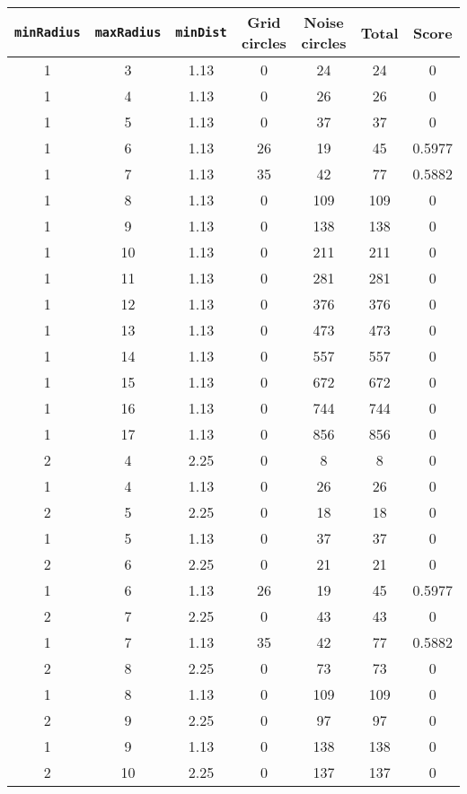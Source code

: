 \documentclass[letterpaper, 12pt]{article}
\begin{document}
\begin{longtable}{|c|c|c|c|c|c|c|}
\hline
\textbf{\texttt{minRadius}} & \textbf{\texttt{maxRadius}} & \textbf{\texttt{minDist}} & \textbf{Grid circles} & \textbf{Noise circles} & \textbf{Total} & \textbf{Score} \\
\hline
1 & 3 & 1.13 & 0 & 24 & 24 & 0 \\
\hline
1 & 4 & 1.13 & 0 & 26 & 26 & 0 \\
\hline
1 & 5 & 1.13 & 0 & 37 & 37 & 0 \\
\hline
1 & 6 & 1.13 & 26 & 19 & 45 & 0.5977 \\
\hline
1 & 7 & 1.13 & 35 & 42 & 77 & 0.5882 \\
\hline
1 & 8 & 1.13 & 0 & 109 & 109 & 0 \\
\hline
1 & 9 & 1.13 & 0 & 138 & 138 & 0 \\
\hline
1 & 10 & 1.13 & 0 & 211 & 211 & 0 \\
\hline
1 & 11 & 1.13 & 0 & 281 & 281 & 0 \\
\hline
1 & 12 & 1.13 & 0 & 376 & 376 & 0 \\
\hline
1 & 13 & 1.13 & 0 & 473 & 473 & 0 \\
\hline
1 & 14 & 1.13 & 0 & 557 & 557 & 0 \\
\hline
1 & 15 & 1.13 & 0 & 672 & 672 & 0 \\
\hline
1 & 16 & 1.13 & 0 & 744 & 744 & 0 \\
\hline
1 & 17 & 1.13 & 0 & 856 & 856 & 0 \\
\hline
2 & 4 & 2.25 & 0 & 8 & 8 & 0 \\
\hline
1 & 4 & 1.13 & 0 & 26 & 26 & 0 \\
\hline
2 & 5 & 2.25 & 0 & 18 & 18 & 0 \\
\hline
1 & 5 & 1.13 & 0 & 37 & 37 & 0 \\
\hline
2 & 6 & 2.25 & 0 & 21 & 21 & 0 \\
\hline
1 & 6 & 1.13 & 26 & 19 & 45 & 0.5977 \\
\hline
2 & 7 & 2.25 & 0 & 43 & 43 & 0 \\
\hline
1 & 7 & 1.13 & 35 & 42 & 77 & 0.5882 \\
\hline
2 & 8 & 2.25 & 0 & 73 & 73 & 0 \\
\hline
1 & 8 & 1.13 & 0 & 109 & 109 & 0 \\
\hline
2 & 9 & 2.25 & 0 & 97 & 97 & 0 \\
\hline
1 & 9 & 1.13 & 0 & 138 & 138 & 0 \\
\hline
2 & 10 & 2.25 & 0 & 137 & 137 & 0 \\

\end{longtable}
\end{document}
